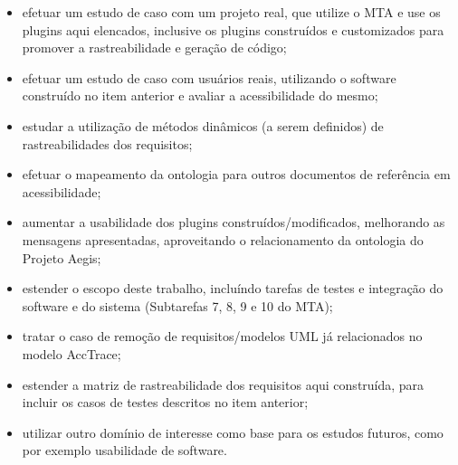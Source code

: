 \documentclass[runningheads,a4paper]{llncs}
\begin{document}
\begin{itemize}
  \item efetuar um estudo de caso com um projeto real, que utilize o MTA e
  use os plugins aqui elencados, inclusive os plugins
  construídos e customizados para promover a rastreabilidade e geração de
  código;
  \item efetuar um estudo de caso com usuários reais, utilizando o
  software construído no item anterior e avaliar a acessibilidade do
  mesmo;
  \item estudar a utilização de métodos dinâmicos (a serem definidos) de
  rastreabilidades dos requisitos;
  \item efetuar o mapeamento da ontologia para outros documentos de referência
  em acessibilidade;
  \item aumentar a usabilidade dos plugins construídos/modificados,
  melhorando as mensagens apresentadas, aproveitando o relacionamento da
  ontologia do Projeto Aegis;
  \item estender o escopo deste trabalho, incluíndo tarefas de testes e
  integração do software e do sistema (Subtarefas 7, 8, 9 e 10 do
  MTA);
  \item tratar o caso de remoção de requisitos/modelos UML já relacionados
  no modelo AccTrace;
  \item estender a matriz de rastreabilidade dos requisitos aqui construída,
  para incluir os casos de testes descritos no item anterior;
  \item utilizar outro domínio de interesse como base para os estudos futuros,
  como por exemplo usabilidade de software.
\end{itemize}
\end{document}
